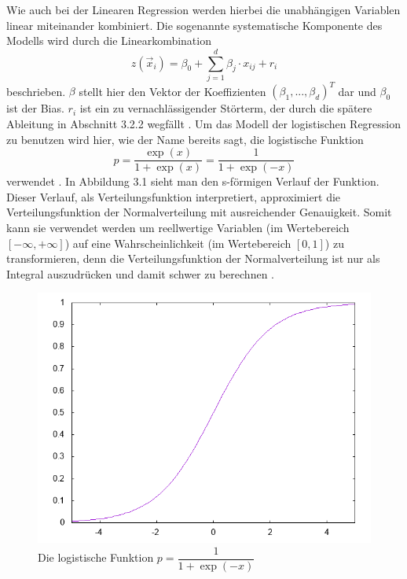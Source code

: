 Wie auch bei der Linearen Regression werden hierbei die unabhängigen Variablen linear miteinander kombiniert. Die sogenannte systematische Komponente des Modells wird durch die Linearkombination
\begin{displaymath}
z(\vec x_i)=\beta_0 + \sum_{j=1}^{d}{\beta_j \cdot x_{ij}} + r_i
\end{displaymath}
beschrieben. $\beta$ stellt hier den Vektor der Koeffizienten $(\beta_1 ,..., \beta_d)^T$ dar und $\beta_0$ ist der Bias. $r_i$ ist ein zu vernachlässigender Störterm, der durch die spätere Ableitung in Abschnitt 3.2.2 wegfällt \cite{ROHR}.
Um das Modell der logistischen Regression zu benutzen wird hier, wie der Name bereits sagt, die logistische Funktion 
\begin{displaymath}
p=\dfrac{\exp(x)}{1+\exp(x)}=\dfrac{1}{1+\exp(-x)}
\end{displaymath}
verwendet \cite{BECK}.
In Abbildung 3.1 sieht man den s-förmigen Verlauf der Funktion. Dieser Verlauf, als Verteilungsfunktion interpretiert, approximiert die Verteilungsfunktion der Normalverteilung mit ausreichender Genauigkeit. Somit kann sie verwendet werden um reellwertige Variablen (im Wertebereich $[-\infty, +\infty]$) auf eine Wahrscheinlichkeit (im Wertebereich $[0,1]$) zu transformieren, denn die Verteilungsfunktion der Normalverteilung ist nur als Integral auszudrücken und damit schwer zu berechnen \cite{WIKI}\cite{BECK}.
\begin{figure}[ht]
\centering
\includegraphics[scale=0.75]{bilder/logistic_reg_func}
\caption{Die logistische Funktion $p=\dfrac{1}{1+\exp(-x)}$ }
\end{figure}\\
